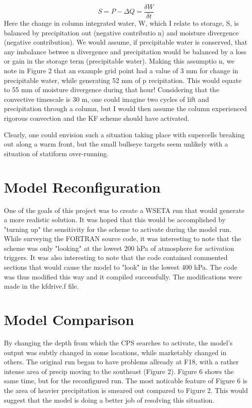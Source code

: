 \documentclass{article}
\begin{document}
\begin{multicols}{2}
\begin{equation}
 S = P - \Delta Q = \frac{\delta W}{\delta t}
 \label{Simple Water Conservation}
\end{equation} 
Here the change in column integrated water, W, which I relate to storage, S, is balanced by precipitation out (negative contributio
n) and moisture divergence (negative contribution).  We would assume, if precipitable water is conserved, that any imbalance betwee
n divergence and precipitation would be balanced by a loss or gain in the storage term (precipitable water).  Making this assumptio
n, we note in Figure 2 that an example grid point had a value of 3 mm for change in precipitable water, while generating 52 mm of p
recipitation.  This would equate to 55 mm of moisture divergence during that hour! Considering that the convective timescale is 30 
m, one could imagine two cycles of lift and precipitation through a column, but I would then assume the column experienced rigorous
 convection and the KF scheme should have activated.


Clearly, one could envision such a situation taking place with supercells breaking out along a warm front, but the small bullseye targets seem unlikely with a situation of statiform over-running.


\section{Model Reconfiguration}
One of the goals of this project was to create a WSETA run that would generate a more realistic solution.  It was hoped that this would be accomplished by "turning up" the sensitivity for the scheme to activate during the model run.  While surveying the FORTRAN source code, it was interesting to note that the scheme was only "looking" at the lowest 200 hPa of atmosphere for activation triggers.  It was also interesting to note that the code contained commented sections that would cause the model to "look" in the lowest 400 hPa.  The code was thus modified this way and it compiled successfully.  The modifications were made in the kfdrive.f file.

\section{Model Comparison}
By changing the depth from which the CPS searches to activate, the model's output was subtly changed in some locations, while marketably changed in others.  The original run began to have problems allready at F18, with a rather intense area of precip moving to the southeast (Figure 2).  Figure 6 shows the same time, but for the reconfigured run.  The most noticable feature of Figure 6 is the area of heavier precipitation is smeared out compared to Figure 2.  This would suggest that the model is doing a better job of resolving this situation.


\end{multicols}
\end{document}
